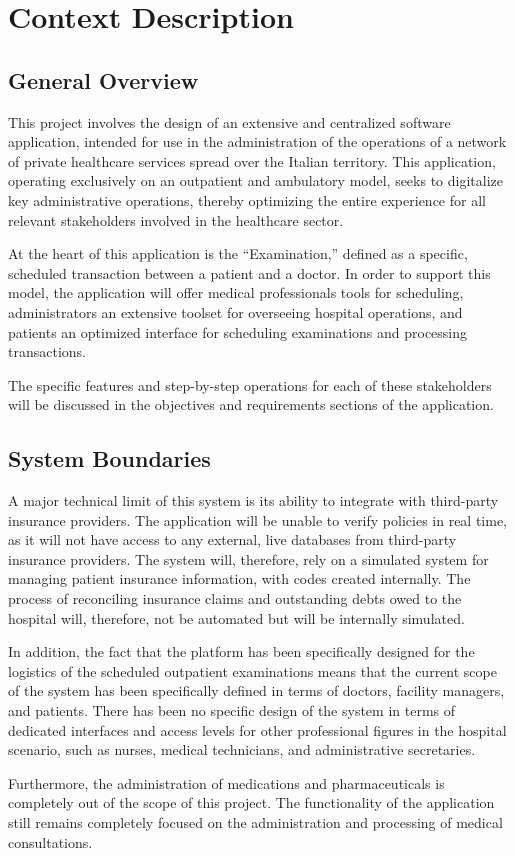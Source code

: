 
\section{Context Description}

\subsection{General Overview}
This project involves the design of an extensive and centralized software application, intended for use in the administration of the operations of a network of private healthcare services spread over the Italian territory. This application, operating exclusively on an outpatient and ambulatory model, seeks to digitalize key administrative operations, thereby optimizing the entire experience for all relevant stakeholders involved in the healthcare sector.

At the heart of this application is the ``Examination,'' defined as a specific, scheduled transaction between a patient and a doctor. In order to support this model, the application will offer medical professionals tools for scheduling, administrators an extensive toolset for overseeing hospital operations, and patients an optimized interface for scheduling examinations and processing transactions.

The specific features and step-by-step operations for each of these stakeholders will be discussed in the objectives and requirements sections of the application.

\subsection{System Boundaries}
A major technical limit of this system is its ability to integrate with third-party insurance providers. The application will be unable to verify policies in real time, as it will not have access to any external, live databases from third-party insurance providers. The system will, therefore, rely on a simulated system for managing patient insurance information, with codes created internally. The process of reconciling insurance claims and outstanding debts owed to the hospital will, therefore, not be automated but will be internally simulated.

In addition, the fact that the platform has been specifically designed for the logistics of the scheduled outpatient examinations means that the current scope of the system has been specifically defined in terms of doctors, facility managers, and patients. There has been no specific design of the system in terms of dedicated interfaces and access levels for other professional figures in the hospital scenario, such as nurses, medical technicians, and administrative secretaries.
      
Furthermore, the administration of medications and pharmaceuticals is completely out of the scope of this project. The functionality of the application still remains completely focused on the administration and processing of medical consultations.
\newpage

\newpage
